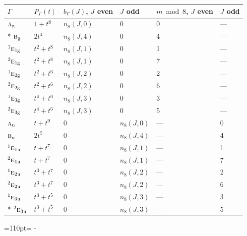 \documentclass[10pt,a4paper]{article}
\newcommand{\needspace}[1]{\par\penalty-100\begingroup\dimen0=#1\relax\dimen2=\pagegoal
  \advance\dimen2-\pagetotal\ifdim\dimen0>\dimen2\relax\ifdim\dimen2>0pt\vfil\break\fi\fi
  \endgroup}
\numberwithin{equation}{section}
\newcommand{\irr}[1]{\text{\normalfont\scshape #1}}
\newcommand{\conjpair}[1]{{}^{#1}}
\newcommand{\ptag}[1]{\mathrm{#1}}
\begin{document}
{\small\begin{longtable}{@{}llllll@{}}\toprule
$\Gamma$ & $P_\Gamma(t)$ & $b_\Gamma(J)$, $J$ even & $J$ odd & $m \bmod 8$, $J$ even & $J$ odd\\\midrule\endhead
\bottomrule\endfoot\endlastfoot
$\irr{a}_{\ptag{g}}$ & $1 + t^{8}$ & $n_{8}(J,0)$ & $0$ & 0 & ---\\*
$\irr{b}_{\ptag{g}}$ & $2t^{4}$ & $n_{8}(J,4)$ & $0$ & 4 & ---\\
$\conjpair{1}\irr{e}_{1\ptag{g}}$ & $t^{2} + t^{8}$ & $n_{8}(J,1)$ & $0$ & 1 & ---\\
$\conjpair{2}\irr{e}_{1\ptag{g}}$ & $t^{2} + t^{8}$ & $n_{8}(J,1)$ & $0$ & 7 & ---\\
$\conjpair{1}\irr{e}_{2\ptag{g}}$ & $t^{2} + t^{6}$ & $n_{8}(J,2)$ & $0$ & 2 & ---\\
$\conjpair{2}\irr{e}_{2\ptag{g}}$ & $t^{2} + t^{6}$ & $n_{8}(J,2)$ & $0$ & 6 & ---\\
$\conjpair{1}\irr{e}_{3\ptag{g}}$ & $t^{4} + t^{6}$ & $n_{8}(J,3)$ & $0$ & 3 & ---\\
$\conjpair{2}\irr{e}_{3\ptag{g}}$ & $t^{4} + t^{6}$ & $n_{8}(J,3)$ & $0$ & 5 & ---\\
$\irr{a}_{\ptag{u}}$ & $t + t^{9}$ & $0$ & $n_{8}(J,0)$ & --- & 0\\
$\irr{b}_{\ptag{u}}$ & $2t^{5}$ & $0$ & $n_{8}(J,4)$ & --- & 4\\
$\conjpair{1}\irr{e}_{1\ptag{u}}$ & $t + t^{7}$ & $0$ & $n_{8}(J,1)$ & --- & 1\\
$\conjpair{2}\irr{e}_{1\ptag{u}}$ & $t + t^{7}$ & $0$ & $n_{8}(J,1)$ & --- & 7\\
$\conjpair{1}\irr{e}_{2\ptag{u}}$ & $t^{3} + t^{7}$ & $0$ & $n_{8}(J,2)$ & --- & 2\\
$\conjpair{2}\irr{e}_{2\ptag{u}}$ & $t^{3} + t^{7}$ & $0$ & $n_{8}(J,2)$ & --- & 6\\
$\conjpair{1}\irr{e}_{3\ptag{u}}$ & $t^{3} + t^{5}$ & $0$ & $n_{8}(J,3)$ & --- & 3\\*
$\conjpair{2}\irr{e}_{3\ptag{u}}$ & $t^{3} + t^{5}$ & $0$ & $n_{8}(J,3)$ & --- & 5\\
\bottomrule\end{longtable}}
\needspace{110pt}
\end{document}
